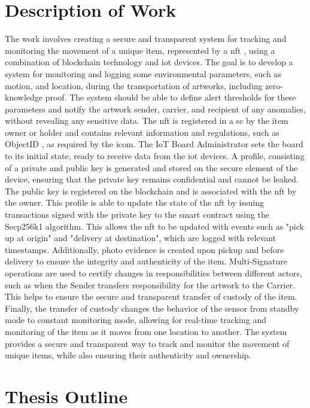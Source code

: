 \section{Description of Work}
The work involves creating a secure and transparent system for tracking and monitoring the movement of a unique item, represented by a \gls{nft} \cite{nftminter}, using a combination of blockchain technology and \gls{iot} devices. The goal is to develop a system for monitoring and logging some environmental parameters, such as motion, and location, during the transportation of artworks, including zero-knowledge proof. The system should be able to define alert thresholds for these parameters and notify the artwork sender, carrier, and recipient of any anomalies, without revealing any sensitive data. The \gls{nft} is registered in a \gls{sc} by the item owner or holder and contains relevant information and regulations, such as ObjectID \cite{objectid}, as required by the \gls{icom}. The IoT Board Administrator sets the board to its initial state, ready to receive data from the \gls{iot} devices. A profile, consisting of a private and public key is generated and stored on the secure element of the device, ensuring that the private key remains confidential and cannot be leaked. The public key is registered on the blockchain and is associated with the \gls{nft} by the owner. This profile is able to update the state of the \gls{nft} by issuing transactions signed with the private key to the smart contract using the Secp256k1 algorithm. This allows the \gls{nft} to be updated with events such as "pick up at origin" and "delivery at destination", which are logged with relevant timestamps. Additionally, photo evidence is created upon pickup and before delivery to ensure the integrity and authenticity of the item. Multi-Signature operations are used to certify changes in responsibilities between different actors, such as when the Sender transfers responsibility for the artwork to the Carrier. This helps to ensure the secure and transparent transfer of custody of the item. Finally, the transfer of custody changes the behavior of the sensor from standby mode to constant monitoring mode, allowing for real-time tracking and monitoring of the item as it moves from one location to another. The system provides a secure and transparent way to track and monitor the movement of unique items, while also ensuring their authenticity and ownership.

\section{Thesis Outline}

